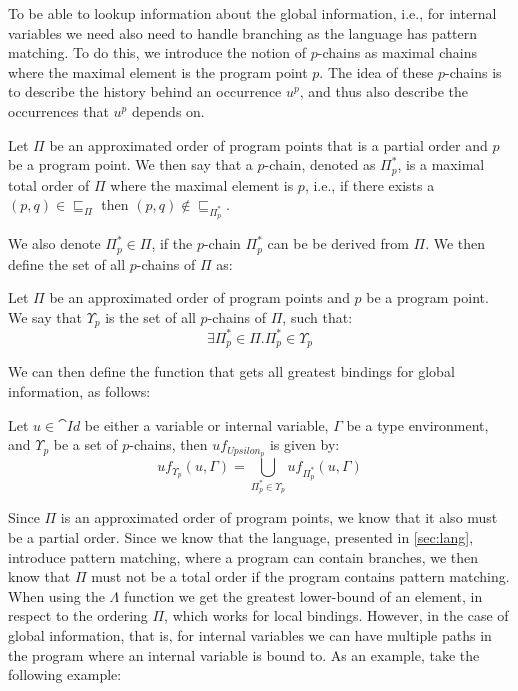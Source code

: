 \documentclass[../../master.tex]{subfiles}
\begin{document}
To be able to lookup information about the global information, i.e., for internal variables we need also need to handle branching as the language has pattern matching.
To do this, we introduce the notion of $p$-chains as maximal chains where the maximal element is the program point $p$.
The idea of these $p$-chains is to describe the history behind an occurrence $u^p$, and thus also describe the occurrences that $u^p$ depends on.

\begin{definition}[$p$-chains]
	Let $\Pi$ be an approximated order of program points that is a partial order and $p$ be a program point.
	We then say that a $p$-chain, denoted as $\Pi_p^{*}$, is a maximal total order of $\Pi$ where the maximal element is $p$, i.e., if there exists a $(p,q)\in\sqsubseteq_\Pi$ then $(p,q)\notin\sqsubseteq_{\Pi_p^{*}}$.
\end{definition}

We also denote $\Pi_p^{*}\in\Pi$, if the $p$-chain $\Pi_p^{*}$ can be be derived from $\Pi$.
We then define the set of all $p$-chains of $\Pi$ as:

\begin{definition}[$\Upsilon$]
	Let $\Pi$ be an approximated order of program points and $p$ be a program point.
	We say that $\Upsilon_p$ is the set of all $p$-chains of $\Pi$, such that:
	$$\exists \Pi_p^{*}\in\Pi.\Pi_p^{*}\in\Upsilon_p$$
\end{definition}

We can then define the function that gets all greatest bindings for global information, as follows:

\begin{definition}
	Let $u\in \cat{Id}$ be either a variable or internal variable, $\Gamma$ be a type environment, and $\Upsilon_p$ be a set of $p$-chains, then $uf_{Upsilon_p}$ is given by:
	$$uf_{\Upsilon_p}(u,\Gamma)=\bigcup_{\Pi_p^{*}\in\Upsilon_p}uf_{\Pi_p^{*}}(u,\Gamma)$$
\end{definition}

\iffalse
Since $\Pi$ is an approximated order of program points, we know that it also must be a partial order.
Since we know that the language, presented in \cref{sec:lang}, introduce pattern matching, where a program can contain branches, we then know that $\Pi$ must not be a total order if the program contains pattern matching.
When using the $\Lambda$ function we get the greatest lower-bound of an element, in respect to the ordering $\Pi$, which works for local bindings.
However, in the case of global information, that is, for internal variables we can have multiple paths in the program where an internal variable is bound to.
As an example, take the following example:
\end{document}
